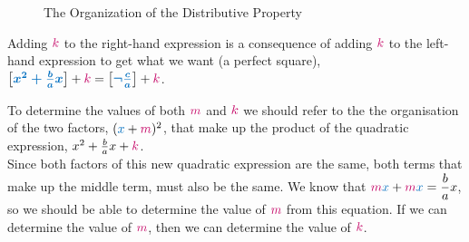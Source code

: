 \documentclass[20150903-160354-rs2.2-MarksMathNotebook.tex]{subfiles}
\begin{document}
\begin{figure}[h!]
\begin{center}
\caption{The Organization of the Distributive Property}
\end{center}
\end{figure}

Adding $\cRed{k}$ to the right-hand expression is a consequence of adding $\cRed{k}$ to the left-hand expression to get what we want (a perfect square), $\farg{x^2 +\frac{b}{a}x}+\cRed{k} = \farg{\neg \frac{c}{a}}+\cRed{k}$.  

To determine the values of both $\cRed{m}$ and $\cRed{k}$ we should refer to the the organisation of the two factors, $(\cBlue{x}+\cRed{m})^2$, that make up the product of the quadratic expression, $x^2 +\frac{b}{a}x+\cRed{k}$.\\

Since both factors of this new quadratic expression are the same, both terms that make up the middle term,  must also be the same.  We know that $\cRed{m}\cBlue{x} + \cRed{m}\cBlue{x}=\dfrac{b}{a}x$, so we should be able to determine the value of $\cRed{m}$ from this equation.    If we can determine the value of $\cRed{m}$, then we can determine the value of  $\cRed{k}$.
\end{document}
